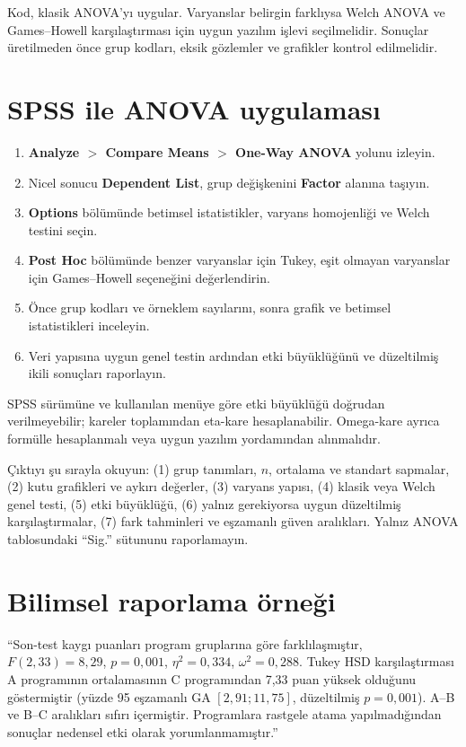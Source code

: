 Kod, klasik ANOVA'yı uygular. Varyanslar belirgin farklıysa Welch ANOVA ve
Games--Howell karşılaştırması için uygun yazılım işlevi seçilmelidir. Sonuçlar
üretilmeden önce grup kodları, eksik gözlemler ve grafikler kontrol edilmelidir.

\section{SPSS ile ANOVA uygulaması}

\begin{enumerate}
  \item \textbf{Analyze $>$ Compare Means $>$ One-Way ANOVA} yolunu izleyin.
  \item Nicel sonucu \textbf{Dependent List}, grup değişkenini \textbf{Factor} alanına taşıyın.
  \item \textbf{Options} bölümünde betimsel istatistikler, varyans homojenliği ve Welch testini seçin.
  \item \textbf{Post Hoc} bölümünde benzer varyanslar için Tukey, eşit olmayan varyanslar için Games--Howell seçeneğini değerlendirin.
  \item Önce grup kodları ve örneklem sayılarını, sonra grafik ve betimsel istatistikleri inceleyin.
  \item Veri yapısına uygun genel testin ardından etki büyüklüğünü ve düzeltilmiş ikili sonuçları raporlayın.
\end{enumerate}

SPSS sürümüne ve kullanılan menüye göre etki büyüklüğü doğrudan verilmeyebilir;
kareler toplamından eta-kare hesaplanabilir. Omega-kare ayrıca formülle
hesaplanmalı veya uygun yazılım yordamından alınmalıdır.

\begin{outputguidebox}
Çıktıyı şu sırayla okuyun: (1) grup tanımları, $n$, ortalama ve standart
sapmalar, (2) kutu grafikleri ve aykırı değerler, (3) varyans yapısı, (4)
klasik veya Welch genel testi, (5) etki büyüklüğü, (6) yalnız gerekiyorsa
uygun düzeltilmiş karşılaştırmalar, (7) fark tahminleri ve eşzamanlı güven
aralıkları. Yalnız ANOVA tablosundaki ``Sig.'' sütununu raporlamayın.
\end{outputguidebox}

\section{Bilimsel raporlama örneği}

``Son-test kaygı puanları program gruplarına göre farklılaşmıştır,
$F(2,33)=8{,}29$, $p=0{,}001$, $\eta^2=0{,}334$,
$\omega^2=0{,}288$. Tukey HSD karşılaştırması A programının ortalamasının C
programından 7,33 puan yüksek olduğunu göstermiştir (yüzde 95 eşzamanlı GA
$[2{,}91;11{,}75]$, düzeltilmiş $p=0{,}001$). A--B ve B--C aralıkları sıfırı
içermiştir. Programlara rastgele atama yapılmadığından sonuçlar nedensel etki
olarak yorumlanmamıştır.''

